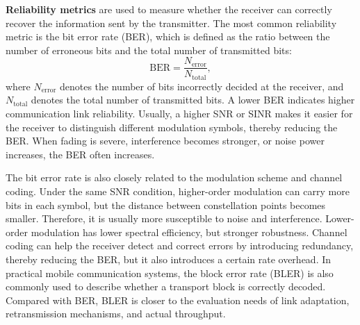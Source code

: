 \textbf{Reliability metrics} are used to measure whether the receiver can correctly recover the information sent by the transmitter.
The most common reliability metric is the bit error rate (BER),
which is defined as the ratio between the number of erroneous bits and the total number of transmitted bits:
\begin{equation}
    \mathrm{BER}
    =
    \frac{N_{\mathrm{error}}}{N_{\mathrm{total}}},
    \label{eq:ber-definition}
\end{equation}
where
\(N_{\mathrm{error}}\) denotes the number of bits incorrectly decided at the receiver,
and \(N_{\mathrm{total}}\) denotes the total number of transmitted bits.
A lower BER indicates higher communication link reliability.
Usually,
a higher SNR or SINR makes it easier for the receiver to distinguish different modulation symbols,
thereby reducing the BER.
When fading is severe,
interference becomes stronger,
or noise power increases,
the BER often increases.

The bit error rate is also closely related to the modulation scheme and channel coding.
Under the same SNR condition,
higher-order modulation can carry more bits in each symbol,
but the distance between constellation points becomes smaller.
Therefore,
it is usually more susceptible to noise and interference.
Lower-order modulation has lower spectral efficiency,
but stronger robustness.
Channel coding can help the receiver detect and correct errors by introducing redundancy,
thereby reducing the BER,
but it also introduces a certain rate overhead.
In practical mobile communication systems,
the block error rate (BLER) is also commonly used
to describe whether a transport block is correctly decoded.
Compared with BER,
BLER is closer to the evaluation needs of link adaptation,
retransmission mechanisms,
and actual throughput.

